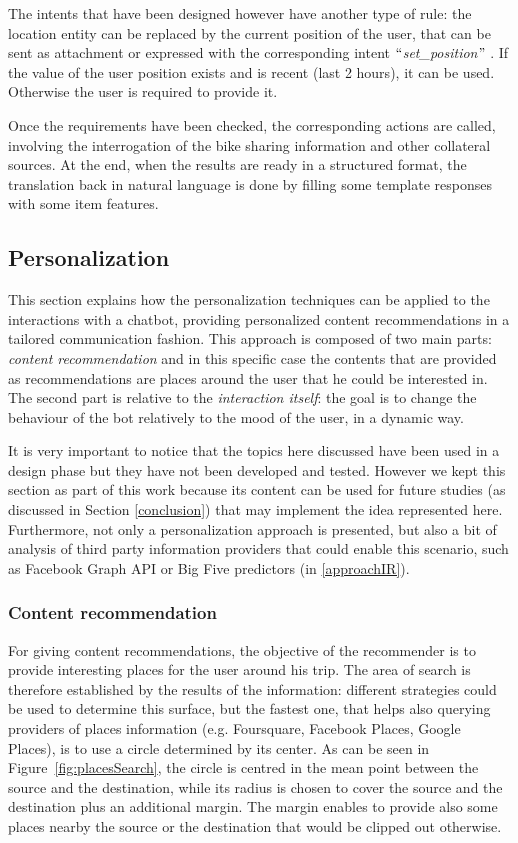 The intents that have been designed however have another type of rule: the location entity can be replaced by the current position of the user, that can be sent as attachment or expressed with the corresponding intent $``$\textit{set\_position}$"$ . If the value of the user position exists and is recent (last 2 hours), it can be used. Otherwise the user is required to provide it.

Once the requirements have been checked, the corresponding actions are called, involving the interrogation of the bike sharing information and other collateral sources. At the end, when the results are ready in a structured format, the translation back in natural language is done by filling some template responses with some item features.

\subsection{Personalization}
\label{approachPersonalization}

This section explains how the personalization techniques can be applied to the interactions with a chatbot, providing personalized content recommendations in a tailored communication fashion. This approach is composed of two main parts: \textit{content recommendation} and in this specific case the contents that are provided as recommendations are places around the user that he could be interested in. The second part is relative to the \textit{interaction itself}: the goal is to change the behaviour of the bot relatively to the mood of the user, in a dynamic way.

It is very important to notice that the topics here discussed have been used in a design phase but they have not been developed and tested. However we kept this section as part of this work because its content can be used for future studies (as discussed in Section \ref{conclusion}) that may implement the idea represented here. Furthermore, not only a personalization approach is presented, but also a bit of analysis of third party information providers that could enable this scenario, such as Facebook Graph API or Big Five predictors (in \ref{approachIR}).

\subsubsection{Content recommendation}
\label{approachRec}

For giving content recommendations, the objective of the recommender is to provide interesting places for the user around his trip. The area of search is therefore established by the results of the information: different strategies could be used to determine this surface, but the fastest one, that helps also querying providers of places information (e.g. Foursquare, Facebook Places, Google Places), is to use a circle determined by its center. As can be seen in Figure~\ref{fig:placesSearch}, the circle is centred in the mean point between the source and the destination, while its radius is chosen to cover the source and the destination plus an additional margin. The margin enables to provide also some places nearby the source or the destination that would be clipped out otherwise.


